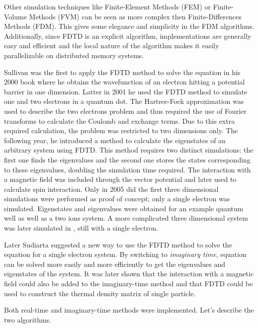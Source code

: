 Other simulation techniques like Finite-Element Methods (FEM) or Finite-Volume
Methods (FVM) can be seen as more complex then Finite-Differences Methods
(FDM). This gives some elegance and simplicity in the FDM algorithms.
Additionally, since FDTD is an explicit algorithm, implementations are
generally easy and efficient and the local nature of the algorithm makes it
easily parallelizable on distributed memory systems.

Sullivan was the first to apply the FDTD method to solve the \schrodinger
equation in his 2000 book\cite{Sullivan2000} where he obtains the wavefunction
of an electron hitting a potential barrier in one dimension.
Latter in 2001 he used the FDTD
method to simulate one and two electrons in a quantum dot\cite{Sullivan2001}.
The Hartree-Fock approximation was used to describe the two electrons problem
and thus required the use of Fourier transforms to calculate the Coulomb
and exchange terms. Due to this extra required calculation, the problem was
restricted to two dimensions only. The following year, he introduced a method
to calculate the eigenstates of an arbitrary system using
FDTD\cite{Sullivan2002}. This method requires two distinct simulations: the
first one finds the eigenvalues and the second one stores the states
corresponding to these eigenvalues, doubling the simulation time required.
The interaction with a magnetic field was included through the vector potential
and later\cite{Sullivan2003,Sullivan2004} used to calculate spin interaction.
Only in 2005 did the first three dimensional
simulations\cite{Sullivan2005a} were performed as proof of concept; only a
single electron was simulated. Eigenstates and eigenvalues were obtained for an
example quantum well as well as a two ions system. A more complicated three
dimensional system was later simulated in \cite{Sullivan2005b}, still with a
single electron.

Later Sudiarta suggested\cite{Sudiarta2007} a new way to use the FDTD method to
solve the \schrodinger equation for a single electron system. By switching to
\textit{imaginary time}, \schrodinger equation can be solved more easily and
more efficiently to get the eigenvalues and eigenstates of the system. It was
later shown that the interaction with a magnetic field could also be added to
the imaginary-time method\cite{Sudiarta2008} and that FDTD could be used to
construct the thermal density matrix of single particle\cite{Sudiarta2009}.

Both real-time and imaginary-time methods were implemented. Let's describe the
two algorithms.


